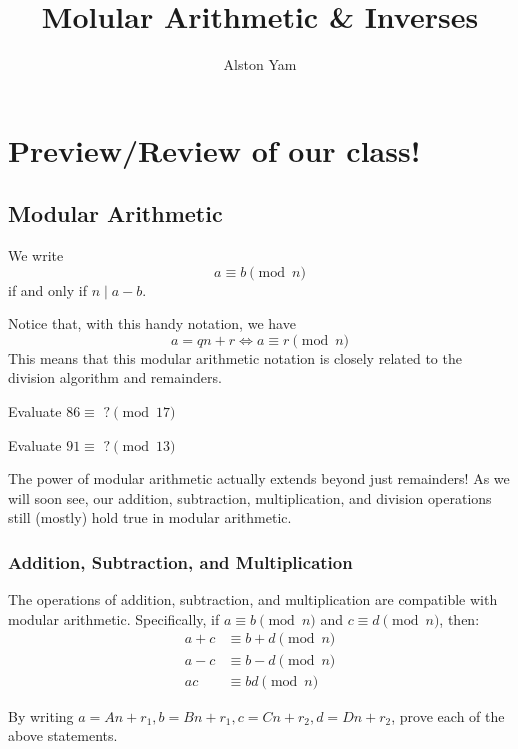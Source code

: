 \documentclass{article}
\title{Molular Arithmetic \& Inverses}
\date{}
\author{Alston Yam}
\theoremstyle{mytheoremstyle}
\theoremstyle{mytheoremstyle}
\theoremstyle{myproblemstyle}
\theoremstyle{myproblemstyle}
\theoremstyle{myproblemstyle}
\begin{document}
    \maketitle
    \section{Preview/Review of our class!}
    \subsection{Modular Arithmetic}
    \begin{definition}
        We write $$a \equiv b \pmod{n}$$ if and only if $n \mid a - b$.
    \end{definition}
    Notice that, with this handy notation, we have  $$a = qn + r \iff a \equiv r \pmod{n}$$ This means that this modular arithmetic notation is closely related to the division algorithm and remainders.
    
    \begin{exercise}
        Evaluate $86 \equiv \text{ ?} \pmod{17}$
    \end{exercise}
    \begin{exercise}
        Evaluate $91 \equiv \text{ ?} \pmod{13}$
    \end{exercise}

    \vspace{3pt}
    The power of modular arithmetic actually extends beyond just remainders! As we will soon see, our addition, subtraction, multiplication, and division operations still (mostly) hold true in modular arithmetic.

    \subsubsection{Addition, Subtraction, and Multiplication}
    The operations of addition, subtraction, and multiplication are compatible with modular arithmetic. Specifically, if $a \equiv b \pmod{n}$ and $c \equiv d \pmod{n}$, then:
    \begin{align*}
        a + c &\equiv b + d \pmod{n} \\
        a - c &\equiv b - d \pmod{n} \\
        ac &\equiv bd \pmod{n}
    \end{align*}

    \begin{exercise}
        By writing $a = An + r_1, b = Bn + r_1, c = Cn + r_2, d = Dn + r_2$, prove each of the above statements.
    \end{exercise}
\end{document}

